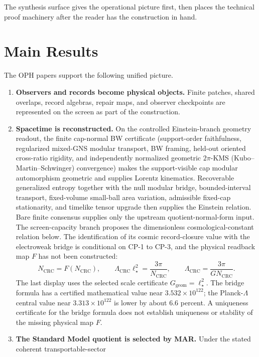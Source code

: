\documentclass[11pt]{article}
\begin{document}
The synthesis surface gives the operational picture first, then places the technical proof machinery
after the reader has the construction in hand.

\section{Main Results}

The OPH papers support the following unified picture.

\begin{enumerate}[leftmargin=2em]
\item \textbf{Observers and records become physical objects.} Finite patches, shared overlaps,
record algebras, repair maps, and observer checkpoints are represented on the screen as part of the
construction.
\item \textbf{Spacetime is reconstructed.} On the controlled Einstein-branch geometry readout,
the finite cap-normal BW certificate (support-order faithfulness, regularized mixed-GNS modular
transport, BW framing, held-out oriented cross-ratio rigidity, and independently normalized
geometric \(2\pi\)-KMS (Kubo--Martin--Schwinger) convergence) makes the support-visible cap modular automorphism geometric
and supplies Lorentz kinematics. Recoverable
generalized entropy together with the null modular bridge, bounded-interval transport, fixed-volume
small-ball area variation, admissible fixed-cap stationarity, and timelike tensor upgrade then
		supplies the Einstein relation. Bare finite consensus supplies only the upstream quotient-normal-form input. The screen-capacity branch proposes the dimensionless
		cosmological-constant relation below. The identification of its cosmic record-closure value with
		the electroweak bridge is conditional on CP-1 to CP-3, and the physical readback map \(F\) has
		not been constructed:
\[
N_{\mathrm{CRC}}=F(N_{\mathrm{CRC}}),
\qquad
\Lambda_{\mathrm{CRC}}\ell_\star^2=\frac{3\pi}{N_{\mathrm{CRC}}},
\qquad
\Lambda_{\mathrm{CRC}}=\frac{3\pi}{G N_{\mathrm{CRC}}}.
\]
The last display uses the selected scale certificate \(G_{\mathrm{geom}}=\ell_\star^2\).
	The bridge formula has a certified mathematical value near \(3.532\times10^{122}\); the
	Planck-\(\Lambda\) central value near \(3.313\times10^{122}\) is lower by about \(6.6\) percent.
	A uniqueness certificate for the bridge formula does not establish uniqueness or stability of
	the missing physical map \(F\).
\item \textbf{The Standard Model quotient is selected by MAR.} Under the stated coherent transportable-sector

\end{enumerate}
\end{document}
